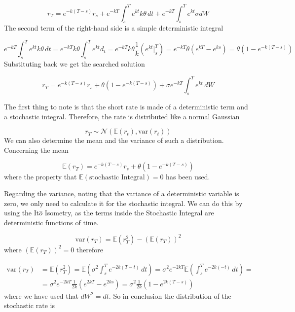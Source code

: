\begin{equation*}
r_T=e^{-k(T-s)}r_s+ e^{-kT}\int^T_s e^{kt}k\theta\,dt +e^{-kT}\int^T_s e^{kt}\sigma dW
\end{equation*}
The second term of the right-hand side is a simple deterministic integral

\begin{equation*}
e^{-kT}\int^T_s e^{kt}k\theta\,dt=e^{-kT}k\theta\int^T_s e^{kt}d_t=e^{-kT}k\theta\frac{1}{k}(e^{kt}|^T_s)= e^{-kT}\theta(e^{kT}-e^{ks})=\theta\left(1-e^{-k(T-s)}\right)
\end{equation*}
Substituting back we get the searched solution

\begin{equation}
r_T=e^{-k(T-s)} r_s+\theta(1-e^{-k(T-s)})+ \sigma e^{-kT}\int^T_s e^{kt}\,dW
\end{equation}

The first thing to note is that the short rate is made of a deterministic term
and a stochastic integral.
Therefore, the rate is distributed like a normal Gaussian

\begin{equation*}
r_T \sim \mathcal{N}(\mathbb{E}(r_t), \textrm{var}(r_t))
\end{equation*}
We can also determine the mean and the variance of such a distribution.
Concerning the mean

\begin{equation}
\mathbb{E}(r_T)=e^{-k(T-s)} r_s+\theta\left(1-e^{-k(T-s)}\right)
\end{equation}
where the property that $\mathbb{E}(\textrm{stochastic~Integral}) = 0$ has been used.

Regarding the variance, noting that the variance of a deterministic variable is zero, we only need to calculate it for the stochastic integral. We can do this by using the It$\hat{o}$ Isometry, as the terms inside the Stochastic Integral are deterministic functions of time.

\begin{equation*}
\textrm{var}(r_T)=\mathbb{E}(r^2_T)-(\mathbb{E}(r_T))^2
\end{equation*}
where $(\mathbb{E}(r_T))^2 = 0$ therefore

\begin{equation}
\begin{aligned}
\textrm{var}(r_T)&=\mathbb{E}(r^2_T)=\mathbb{E}(\sigma^2 \int^T_s e^{-2k(T-t)}\,dt)=\sigma^2 e^{-2kT} \mathbb{E}( \int^T_s e^{-2k(-t)}\,dt)=\\
&=\sigma^2 e^{-2kT} \frac {1}{2k}(e^{2kT}-e^{2ks})=\sigma^2 \frac {1}{2k}(1-e^{2k(T-s)}) 
\end{aligned}
\end{equation}
where we have used that $dW^2 = dt$.
So in conclusion the distribution of the stochastic rate is

